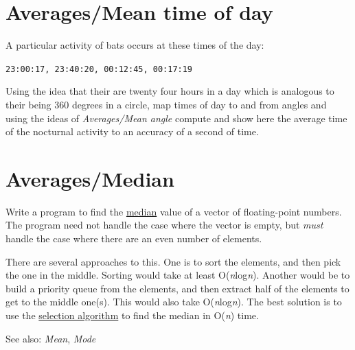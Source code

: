 \pagebreak{}
\section*{Averages/Mean time of day}

A particular activity of bats occurs at these times of the day:

\texttt{23:00:17, 23:40:20, 00:12:45, 00:17:19}

Using the idea that their are twenty four hours in a day which is
analogous to their being 360 degrees in a circle, map times of day to
and from angles and using the ideas of \emph{Averages/Mean angle}
compute and show here the average time of the nocturnal activity to an
accuracy of a second of time.



\pagebreak{}
\section*{Averages/Median}

Write a program to find the
\href{http://en.wikipedia.org/wiki/Median}{median} value of a vector
of floating-point numbers. The program need not handle the case where
the vector is empty, but \emph{must} handle the case where there are
an even number of elements.

There are several approaches to this. One is to sort the elements, and
then pick the one in the middle. Sorting would take at least
O(\emph{n}log\emph{n}). Another would be to build a priority queue
from the elements, and then extract half of the elements to get to the
middle one(s). This would also take O(\emph{n}log\emph{n}). The best
solution is to use the
\href{http://en.wikipedia.org/wiki/Selection\_algorithm}{selection
  algorithm} to find the median in O(\emph{n}) time.

See also: \emph{Mean}, \emph{Mode}

